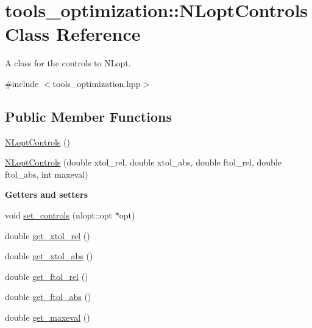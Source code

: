 \hypertarget{classtools__optimization_1_1_n_lopt_controls}{}\section{tools\+\_\+optimization\+:\+:N\+Lopt\+Controls Class Reference}
\label{classtools__optimization_1_1_n_lopt_controls}


A class for the controls to N\+Lopt.  




{\ttfamily \#include $<$tools\+\_\+optimization.\+hpp$>$}

\subsection*{Public Member Functions}
\begin{DoxyCompactItemize}
\item 
\hyperlink{classtools__optimization_1_1_n_lopt_controls_a52cd5fa51d62766df824ca9818750332}{N\+Lopt\+Controls} ()
\item 
\hyperlink{classtools__optimization_1_1_n_lopt_controls_a2998eafd73b87482eae2c096dbca9a18}{N\+Lopt\+Controls} (double xtol\+\_\+rel, double xtol\+\_\+abs, double ftol\+\_\+rel, double ftol\+\_\+abs, int maxeval)
\end{DoxyCompactItemize}
\begin{Indent}{\bf Getters and setters}\par
\begin{DoxyCompactItemize}
\item 
void \hyperlink{classtools__optimization_1_1_n_lopt_controls_a59c40c69cb94f9d27ecffed93ca3790e}{set\+\_\+controls} (nlopt\+::opt $\ast$opt)
\item 
double \hyperlink{classtools__optimization_1_1_n_lopt_controls_ad2f17256e9a2d48fae022e42bc45910e}{get\+\_\+xtol\+\_\+rel} ()
\item 
double \hyperlink{classtools__optimization_1_1_n_lopt_controls_ade4ee01928ec765014bd262ef461d4f9}{get\+\_\+xtol\+\_\+abs} ()
\item 
double \hyperlink{classtools__optimization_1_1_n_lopt_controls_a5245196ee24b2ed5324fbf3ddb14c511}{get\+\_\+ftol\+\_\+rel} ()
\item 
double \hyperlink{classtools__optimization_1_1_n_lopt_controls_a0ad0764bb8afefb9ee22f82d3c2d8405}{get\+\_\+ftol\+\_\+abs} ()
\item 
double \hyperlink{classtools__optimization_1_1_n_lopt_controls_aa0f383dc8d7c5556ac5f20774423dc83}{get\+\_\+maxeval} ()
\end{DoxyCompactItemize}
\end{Indent}


